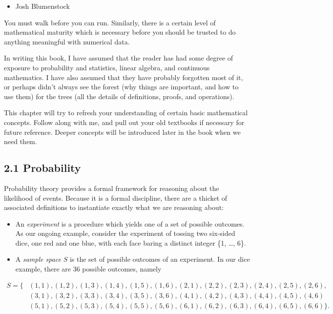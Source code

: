 \documentclass[10pt]{article}
\begin{document}
\begin{itemize}
  \item Josh Blumenstock
\end{itemize}

You must walk before you can run. Similarly, there is a certain level of mathematical maturity which is necessary before you should be trusted to do anything meaningful with numerical data.

In writing this book, I have assumed that the reader has had some degree of exposure to probability and statistics, linear algebra, and continuous mathematics. I have also assumed that they have probably forgotten most of it, or perhaps didn't always see the forest (why things are important, and how to use them) for the trees (all the details of definitions, proofs, and operations).

This chapter will try to refresh your understanding of certain basic mathematical concepts. Follow along with me, and pull out your old textbooks if necessary for future reference. Deeper concepts will be introduced later in the book when we need them.

\subsection*{2.1 Probability}
Probability theory provides a formal framework for reasoning about the likelihood of events. Because it is a formal discipline, there are a thicket of associated definitions to instantiate exactly what we are reasoning about:

\begin{itemize}
  \item An \textit{experiment} is a procedure which yields one of a set of possible outcomes. As our ongoing example, consider the experiment of tossing two six-sided dice, one red and one blue, with each face baring a distinct integer \{1, \ldots, 6\}.
  \item A \textit{sample space} $S$ is the set of possible outcomes of an experiment. In our dice example, there are 36 possible outcomes, namely
\end{itemize}

\[
\begin{aligned}
S=\{ & (1,1),(1,2),(1,3),(1,4),(1,5),(1,6),(2,1),(2,2),(2,3),(2,4),(2,5),(2,6), \\
& (3,1),(3,2),(3,3),(3,4),(3,5),(3,6),(4,1),(4,2),(4,3),(4,4),(4,5),(4,6) \\
& (5,1),(5,2),(5,3),(5,4),(5,5),(5,6),(6,1),(6,2),(6,3),(6,4),(6,5),(6,6)\} .
\end{aligned}
\]
\end{document}
